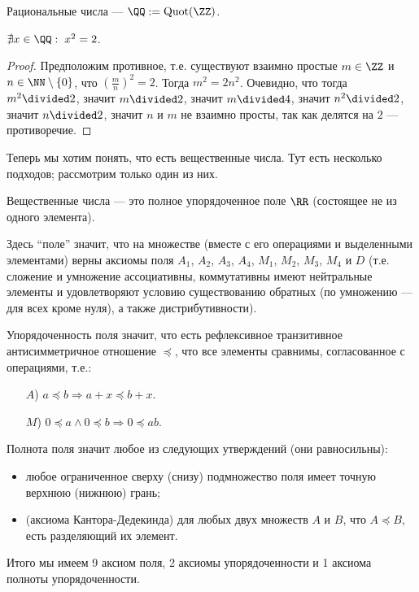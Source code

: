 \documentclass[12pt,a4paper]{article}
\DeclareMathOperator{\Quot}{Quot}
\begin{document}
    \begin{definition}
        Рациональные числа --- $\QQ := \Quot(\ZZ)$.
    \end{definition}

    \begin{theorem}
        $\nexists x\in \QQ:\; x^2 = 2$.
    \end{theorem}

    \begin{proof}
        Предположим противное, т.е. существуют взаимно простые $m \in \ZZ$ и $n \in \NN\setminus\{0\}$, что $(\frac{m}{n})^2 = 2$. Тогда $m^2 = 2n^2$. Очевидно, что тогда $m^2 \divided 2$, значит $m\divided 2$, значит $m\divided 4$, значит $n^2 \divided 2$, значит $n \divided 2$, значит $n$ и $m$ не взаимно просты, так как делятся на $2$ --- противоречие.
    \end{proof}

    Теперь мы хотим понять, что есть вещественные числа. Тут есть несколько подходов; рассмотрим только один из них.

    \begin{definition}
        Вещественные числа --- это полное упорядоченное поле $\RR$ (состоящее не из одного элемента).
        
        Здесь ``поле'' значит, что на множестве (вместе с его операциями и выделенными элементами) верны аксиомы поля $A_1$, $A_2$, $A_3$, $A_4$, $M_1$, $M_2$, $M_3$, $M_4$ и $D$ (т.е. сложение и умножение ассоциативны, коммутативны имеют нейтральные элементы и удовлетворяют условию существованию обратных (по умножению --- для всех кроме нуля), а также дистрибутивности).
        
        Упорядоченность поля значит, что есть рефлексивное транзитивное антисимметричное отношение $\preccurlyeq$, что все элементы сравнимы, согласованное с операциями, т.е.:
        \begin{itemize}
            \item[$A$)] $a \preccurlyeq b \Rightarrow a + x \preccurlyeq b + x$.
            \item[$M$)] $0 \preccurlyeq a \wedge 0 \preccurlyeq b \Rightarrow 0 \preccurlyeq ab$.
        \end{itemize}

        Полнота поля значит любое из следующих утверждений (они равносильны):
        \begin{itemize}
            \item любое ограниченное сверху (снизу) подмножество поля имеет точную верхнюю (нижнюю) грань;
            \item (аксиома Кантора-Дедекинда) для любых двух множеств $A$ и $B$, что $A \preccurlyeq B$, есть разделяющий их элемент.
        \end{itemize}

        Итого мы имеем 9 аксиом поля, 2 аксиомы упорядоченности и 1 аксиома полноты упорядоченности.
    \end{definition}
\end{document}
